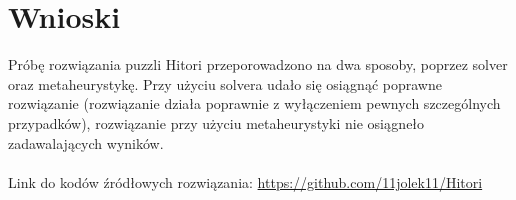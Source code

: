 \documentclass{article}
\begin{document}

\section{Wnioski}
Próbę rozwiązania puzzli Hitori przeporowadzono na dwa sposoby, poprzez solver oraz metaheurystykę. 
Przy użyciu solvera udało się osiągnąć poprawne rozwiązanie (rozwiązanie działa poprawnie z wyłączeniem pewnych szczególnych przypadków), rozwiązanie przy użyciu metaheurystyki nie osiągneło zadawalających wyników.
\\
\\
Link do kodów źródłowych rozwiązania:
\url{https://github.com/11jolek11/Hitori}
\end{document}
